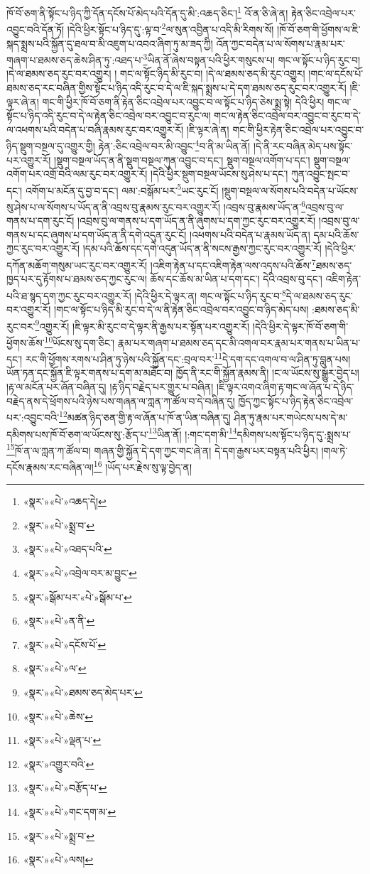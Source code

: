 ཁོ་བོ་ཅག་ནི་སྟོང་པ་ཉིད་ཀྱི་དོན་དངོས་པོ་མེད་པའི་དོན་དུ་མི་:འཆད་ཅིང་།\footnote{«སྣར་»«པེ་»འཆད་དེ།} འོ་ན་ཅི་ཞེ་ན། རྟེན་ཅིང་འབྲེལ་པར་འབྱུང་བའི་དོན་ཏོ། །དེའི་ཕྱིར་སྟོང་པ་ཉིད་དུ་:ལྟ་བ་\footnote{«སྣར་»«པེ་»སྨྲ་བ་}ལ་སུན་འབྱིན་པ་འདི་མི་རིགས་སོ། །ཁོ་བོ་ཅག་གི་ཕྱོགས་ལ་ཇི་སྐད་སྨྲས་པའི་སྐྱོན་དུ་ཐལ་བ་མི་འཇུག་པ་འབའ་ཞིག་ཏུ་མ་ཟད་ཀྱི། འོན་ཀྱང་བདེན་པ་ལ་སོགས་པ་རྣམ་པར་གཞག་པ་ཐམས་ཅད་ཆེས་ཤིན་ཏུ་:འཐད་པ་\footnote{«སྣར་»«པེ་»འཐད་པའི་}ཡིན་ནོ་ཞེས་བསྟན་པའི་ཕྱིར་གསུངས་པ། གང་ལ་སྟོང་པ་ཉིད་རུང་བ། །དེ་ལ་ཐམས་ཅད་རུང་བར་འགྱུར། །
གང་ལ་སྟོང་ཉིད་མི་རུང་བ། །དེ་ལ་ཐམས་ཅད་མི་རུང་འགྱུར། །གང་ལ་དངོས་པོ་ཐམས་ཅད་རང་བཞིན་གྱིས་སྟོང་པ་ཉིད་འདི་རུང་བ་དེ་ལ་ཇི་སྐད་སྨྲས་པ་དེ་དག་ཐམས་ཅད་རུང་བར་འགྱུར་རོ། །ཇི་ལྟར་ཞེ་ན། གང་གི་ཕྱིར་ཁོ་བོ་ཅག་ནི་རྟེན་ཅིང་འབྲེལ་པར་འབྱུང་བ་ལ་སྟོང་པ་ཉིད་ཅེས་སྨྲ་སྟེ། དེའི་ཕྱིར། གང་ལ་སྟོང་པ་ཉིད་འདི་རུང་བ་དེ་ལ་རྟེན་ཅིང་འབྲེལ་བར་འབྱུང་བ་རུང་ལ། གང་ལ་རྟེན་ཅིང་འབྲེལ་བར་འབྱུང་བ་རུང་བ་དེ་ལ་འཕགས་པའི་བདེན་པ་བཞི་རྣམས་རུང་བར་འགྱུར་རོ། །ཇི་ལྟར་ཞེ་ན། གང་གི་ཕྱིར་རྟེན་ཅིང་འབྲེལ་པར་འབྱུང་བ་ཉིད་སྡུག་བསྔལ་དུ་འགྱུར་གྱི། རྟེན་:ཅིང་འབྲེལ་བར་མི་འབྱུང་\footnote{«སྣར་»«པེ་»འབྲེལ་བར་མ་བྱུང་}བ་ནི་མ་ཡིན་ནོ། །དེ་ནི་རང་བཞིན་མེད་པས་སྟོང་པར་འགྱུར་རོ། །སྡུག་བསྔལ་ཡོད་ན་ནི་སྡུག་བསྔལ་ཀུན་འབྱུང་བ་དང་། སྡུག་བསྔལ་འགོག་པ་དང་། སྡུག་བསྔལ་འགོག་པར་འགྲོ་བའི་ལམ་རུང་བར་འགྱུར་རོ། །དེའི་ཕྱིར་སྡུག་བསྔལ་ཡོངས་སུ་ཤེས་པ་དང་། ཀུན་འབྱུང་སྤང་བ་དང་། འགོག་པ་མངོན་དུ་བྱ་བ་དང་། ལམ་:བསྒོམ་པར་\footnote{«སྣར་»སྒོམ་པར་«པེ་»སྒོམ་པ་}ཡང་རུང་ངོ། །སྡུག་བསྔལ་ལ་སོགས་པའི་བདེན་པ་ཡོངས་སུ་ཤེས་པ་ལ་སོགས་པ་ཡོད་ན་ནི་འབྲས་བུ་རྣམས་རུང་བར་འགྱུར་རོ། །འབྲས་བུ་རྣམས་ཡོད་ན་\footnote{«སྣར་»«པེ་»ན་ནི་}འབྲས་བུ་ལ་གནས་པ་དག་རུང་ངོ། །འབྲས་བུ་ལ་གནས་པ་དག་ཡོད་ན་ནི་ཞུགས་པ་དག་ཀྱང་རུང་བར་འགྱུར་རོ། །འབྲས་བུ་ལ་གནས་པ་དང་ཞུགས་པ་དག་ཡོད་ན་ནི་དགེ་འདུན་རུང་ངོ། །འཕགས་པའི་བདེན་པ་རྣམས་ཡོད་ན། དམ་པའི་ཆོས་ཀྱང་རུང་བར་འགྱུར་རོ། །དམ་པའི་ཆོས་དང་དགེ་འདུན་ཡོད་ན་ནི་སངས་རྒྱས་ཀྱང་རུང་བར་འགྱུར་རོ། །དེའི་ཕྱིར་དཀོན་མཆོག་གསུམ་ཡང་རུང་བར་འགྱུར་རོ། །འཇིག་རྟེན་པ་དང་འཇིག་རྟེན་ལས་འདས་པའི་ཆོས་\footnote{«སྣར་»«པེ་»དངོས་པོ་}ཐམས་ཅད་ཁྱད་པར་དུ་རྟོགས་པ་ཐམས་ཅད་ཀྱང་རུང་ལ། ཆོས་དང་ཆོས་མ་ཡིན་པ་དག་དང་། དེའི་འབྲས་བུ་དང་། འཇིག་རྟེན་པའི་ཐ་སྙད་དག་ཀྱང་རུང་བར་འགྱུར་རོ། །དེའི་ཕྱིར་དེ་ལྟར་ན། གང་ལ་སྟོང་པ་ཉིད་རུང་བ་\footnote{«སྣར་»«པེ་»ལ་}དེ་ལ་ཐམས་ཅད་རུང་བར་འགྱུར་རོ། །གང་ལ་སྟོང་པ་ཉིད་མི་རུང་བ་དེ་ལ་ནི་རྟེན་ཅིང་འབྲེལ་བར་འབྱུང་བ་ཉིད་མེད་པས། :ཐམས་ཅད་མི་རུང་བར་\footnote{«སྣར་»«པེ་»ཐམས་ཅད་མེད་པར་}འགྱུར་རོ། །ཇི་ལྟར་མི་རུང་བ་དེ་ལྟར་ནི་རྒྱས་པར་སྟོན་པར་འགྱུར་རོ། །དེའི་ཕྱིར་དེ་ལྟར་ཁོ་བོ་ཅག་གི་ཕྱོགས་ཆོས་\footnote{«སྣར་»«པེ་»ཆེས་}ཡོངས་སུ་དག་ཅིང་། རྣམ་པར་གཞག་པ་ཐམས་ཅད་དང་མི་འགལ་བར་རྣམ་པར་གནས་པ་ཡིན་པ་དང་། རང་གི་ཕྱོགས་རགས་པ་ཤིན་ཏུ་ཉེས་པའི་སྐྱོན་དང་:བྲལ་བར་\footnote{«སྣར་»«པེ་»ལྡན་པ་}དེ་དག་དང་འགལ་བ་ལ་ཤིན་ཏུ་བླུན་པས། ཡོན་ཏན་དང་སྐྱོན་ཇི་ལྟར་གནས་པ་དག་མ་མཐོང་བ། ཁྱོད་ནི་རང་གི་སྐྱོན་རྣམས་ནི། །ང་ལ་ཡོངས་སུ་སྒྱུར་བྱེད་པ། །རྟ་ལ་མངོན་པར་ཞོན་བཞིན་དུ། །རྟ་ཉིད་བརྗེད་པར་གྱུར་པ་བཞིན། །ཇི་ལྟར་འགའ་ཞིག་རྟ་གང་ལ་ཞོན་པ་དེ་ཉིད་བརྗེད་ནས་དེ་ཕྲོགས་པའི་ཉེས་པས་གཞན་ལ་ཀླན་ཀ་ཚོལ་བ་དེ་བཞིན་དུ། ཁྱོད་ཀྱང་སྟོང་པ་ཉིད་རྟེན་ཅིང་འབྲེལ་པར་:འབྱུང་བའི་\footnote{«སྣར་»འགྱུར་བའི་}མཚན་ཉིད་ཅན་གྱི་རྟ་ལ་ཞོན་པ་ཁོ་ན་ཡིན་བཞིན་དུ། ཤིན་ཏུ་རྣམ་པར་གཡེངས་པས་དེ་མ་དམིགས་པས་ཁོ་བོ་ཅག་ལ་ཡོངས་སུ་:རྩོད་པ་\footnote{«སྣར་»«པེ་»བརྩོད་པ་}ཡིན་ནོ། །:གང་དག་མི་\footnote{«སྣར་»«པེ་»གང་དག་མ་}དམིགས་པས་སྟོང་པ་ཉིད་དུ་:སྨྲས་པ་\footnote{«སྣར་»«པེ་»སྨྲ་བ་}ཁོ་ན་ལ་ཀླན་ཀ་ཚོལ་བ། གཞན་གྱི་སྐྱོན་དེ་དག་ཀྱང་གང་ཞེ་ན། དེ་དག་རྒྱས་པར་བསྟན་པའི་ཕྱིར། །གལ་ཏེ་དངོས་རྣམས་རང་བཞིན་ལ།\footnote{«སྣར་»«པེ་»ལས།} །ཡོད་པར་རྗེས་སུ་ལྟ་བྱེད་ན། 
